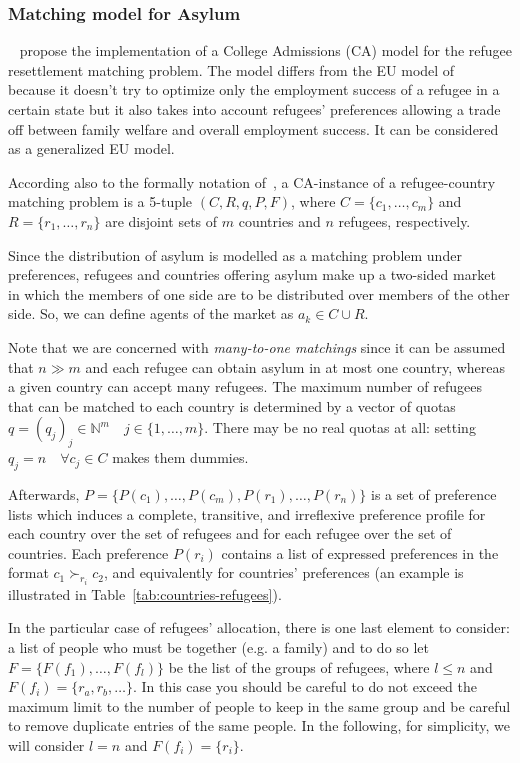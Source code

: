 \documentclass[letterpaper]{article} %
\begin{document}
    \subsubsection{Matching model for Asylum}\label{matching-model-for-asylum}%
    ~\citet{olbergml,basshuysen,delacretaz_2020,fernandez} propose the implementation of a College Admissions (CA) model for the refugee resettlement matching problem.
    The model differs from the EU model of~\citet{basshuysen} because it doesn't try to optimize only the employment success of a refugee in a certain state but it also takes into account refugees' preferences allowing a trade off between family welfare and overall employment success.
    It can be considered as a generalized EU model.

    According also to the formally notation of~\citet{salles}, a CA-instance of a refugee-country matching problem is a 5-tuple \((C, R, q, P, F)\), where \(C = \{c_1, \dots, c_m\}\) and \(R = \{r_1, \dots, r_n\}\) are disjoint sets of \(m\) countries and \(n\) refugees, respectively.

    Since the distribution of asylum is modelled as a matching problem under preferences, refugees and countries offering asylum make up a two-sided market in which the members of one side are to be distributed over members of the other side.
    So, we can define agents of the market as \(a_k \in C \cup R\).
    
    Note that we are concerned with \textit{many-to-one matchings} since it can be assumed that \(n \gg m\) and each refugee can obtain asylum in at most one country, whereas a given country can accept many refugees. The maximum number of refugees that can be matched to each country is determined by a vector of quotas \(q = (q_j)_j \in \mathbb{N}^m \quad j\in\{1,\dots ,m\}\). There may be no real quotas at all: setting \(q_j = n \quad \forall c_j \in C\) makes them dummies.

    Afterwards, \(P = \{P(c_1), \dots, P(c_m), P(r_1), \dots, P(r_n)\}\) is a set of preference lists which induces a complete, transitive, and irreflexive preference profile for each country over the set of refugees and for each refugee over the set of countries.
    Each preference \(P(r_i)\) contains a list of expressed preferences in the format \(c_1 \succ_{r_i} c_2\), and equivalently for countries' preferences (an example is illustrated in Table~\ref{tab:countries-refugees}).

    In the particular case of refugees' allocation, there is one last element to consider: a list of people who must be together (e.g. a family) and to do so let \(F=\{F(f_1), \dots, F(f_l)\}\) be the list of the groups of refugees, where \(l \leq n\) and \(F(f_i) = \{r_a, r_b, \dots\}\).
    In this case you should be careful to do not exceed the maximum limit to the number of people to keep in the same group and be careful to remove duplicate entries of the same people.
    In the following, for simplicity, we will consider \(l=n\) and \(F(f_i)=\{r_i\}\).
\end{document}
